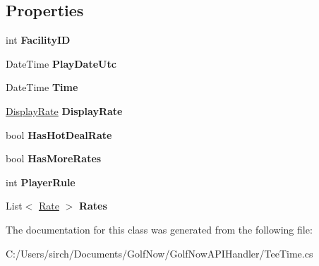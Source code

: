 \subsection*{Properties}
\begin{DoxyCompactItemize}
\item 
\mbox{\label{class_golf_now_a_p_i_1_1_tee_time_acc5b3e5ad229b7f757f68e35615c7b1a}} 
int {\bfseries Facility\+ID}
\item 
\mbox{\label{class_golf_now_a_p_i_1_1_tee_time_a8d0b67b276e4464d057ba91464a6ca2a}} 
Date\+Time {\bfseries Play\+Date\+Utc}
\item 
\mbox{\label{class_golf_now_a_p_i_1_1_tee_time_a042325ec52c145a749f0798e4b34a118}} 
Date\+Time {\bfseries Time}
\item 
\mbox{\label{class_golf_now_a_p_i_1_1_tee_time_af454845f9df8ff47fbbefda9958cce0c}} 
\mbox{\hyperlink{class_golf_now_a_p_i_handler_1_1_display_rate}{Display\+Rate}} {\bfseries Display\+Rate}
\item 
\mbox{\label{class_golf_now_a_p_i_1_1_tee_time_aff17613908ce499c48e952c29b333ccc}} 
bool {\bfseries Has\+Hot\+Deal\+Rate}
\item 
\mbox{\label{class_golf_now_a_p_i_1_1_tee_time_aa6a789b3cecd305e6b077fac90cd02e9}} 
bool {\bfseries Has\+More\+Rates}
\item 
\mbox{\label{class_golf_now_a_p_i_1_1_tee_time_aaa05f9201e2dc83776ba49b4b9593bcc}} 
int {\bfseries Player\+Rule}
\item 
\mbox{\label{class_golf_now_a_p_i_1_1_tee_time_a376fbd7c443281ae33ea42f027041e34}} 
List$<$ \mbox{\hyperlink{class_golf_now_a_p_i_handler_1_1_rate}{Rate}} $>$ {\bfseries Rates}
\end{DoxyCompactItemize}


The documentation for this class was generated from the following file\+:\begin{DoxyCompactItemize}
\item 
C\+:/\+Users/sirch/\+Documents/\+Golf\+Now/\+Golf\+Now\+A\+P\+I\+Handler/Tee\+Time.\+cs\end{DoxyCompactItemize}

